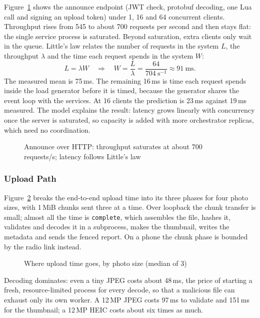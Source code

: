 Figure~\ref{fig:chart-announce} shows the announce endpoint (JWT check, protobuf decoding, one Lua call and signing an upload token) under 1, 16 and 64 concurrent clients. Throughput rises from 545 to about 700 requests per second and then stays flat: the single service process is saturated. Beyond saturation, extra clients only wait in the queue. Little's law relates the number of requests in the system $L$, the throughput $\lambda$ and the time each request spends in the system $W$:
\begin{equation}\label{eq:little}
  L = \lambda W \quad\Rightarrow\quad W = \frac{L}{\lambda} = \frac{64}{704\ \text{s}^{-1}} \approx 91\ \text{ms}.
\end{equation}
The measured mean is 75\,ms. The remaining 16\,ms is time each request spends inside the load generator before it is timed, because the generator shares the event loop with the services. At 16 clients the prediction is 23\,ms against 19\,ms measured. The model explains the result: latency grows linearly with concurrency once the server is saturated, so capacity is added with more orchestrator replicas, which need no coordination.

\begin{figure}[H]
\centering
{}
\caption{Announce over HTTP: throughput saturates at about 700 requests/s; latency follows Little's law}\label{fig:chart-announce}
\end{figure}

\subsubsection{Upload Path}

Figure~\ref{fig:chart-upload} breaks the end-to-end upload time into its three phases for four photo sizes, with 1\,MiB chunks sent three at a time. Over loopback the chunk transfer is small; almost all the time is \texttt{complete}, which assembles the file, hashes it, validates and decodes it in a subprocess, makes the thumbnail, writes the metadata and sends the fenced report. On a phone the chunk phase is bounded by the radio link instead.

\begin{figure}[H]
\centering
{}
\caption{Where upload time goes, by photo size (median of 3)}\label{fig:chart-upload}
\end{figure}

Decoding dominates: even a tiny JPEG costs about 48\,ms, the price of starting a fresh, resource-limited process for every decode, so that a malicious file can exhaust only its own worker. A 12\,MP JPEG costs 97\,ms to validate and 151\,ms for the thumbnail; a 12\,MP HEIC costs about six times as much.

